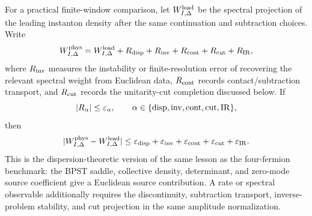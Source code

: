 \begin{controlledapproximation}
For a practical finite-window comparison, let \(W_{I,\Delta}^{\rm lead}\) be the
spectral projection of the leading instanton density after the same
continuation and subtraction choices.  Write
\[
  W_{I,\Delta}^{\rm phys}
  =
  W_{I,\Delta}^{\rm lead}
  +
  R_{\rm disp}
  +
  R_{\rm inv}
  +
  R_{\rm cont}
  +
  R_{\rm cut}
  +
  R_{\rm IR},
\]
where \(R_{\rm inv}\) measures the instability or finite-resolution error of
recovering the relevant spectral weight from Euclidean data, \(R_{\rm cont}\)
records contact/subtraction transport, and \(R_{\rm cut}\) records the
unitarity-cut completion discussed below.  If
\[
  |R_\alpha|\le\varepsilon_\alpha,\qquad
  \alpha\in\{{\rm disp},{\rm inv},{\rm cont},{\rm cut},{\rm IR}\},
\]
then
\begin{equation}
  |W_{I,\Delta}^{\rm phys}-W_{I,\Delta}^{\rm lead}|
  \le
  \varepsilon_{\rm disp}+\varepsilon_{\rm inv}+\varepsilon_{\rm cont}
  +\varepsilon_{\rm cut}+\varepsilon_{\rm IR}.
  \label{eq:instanton-spectral-projection-residual-bound}
\end{equation}
This is the dispersion-theoretic version of the same lesson as the
four-fermion benchmark: the BPST saddle, collective density, determinant, and
zero-mode source coefficient give a Euclidean source contribution.  A rate or
spectral observable additionally requires the discontinuity, subtraction
transport, inverse-problem stability, and cut projection in the same amplitude
normalization.
\end{controlledapproximation}

